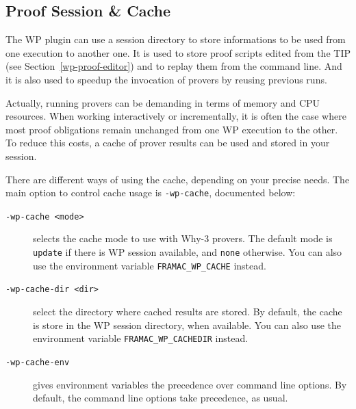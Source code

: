 \clearpage
\subsection{Proof Session \& Cache}
\label{wp-cache}

The \textsf{WP} plugin can use a session directory to store informations to be used from one execution to another one.
It is used to store proof scripts edited from the TIP (see Section~\ref{wp-proof-editor}) and to replay them from the command line.
And it is also used to speedup the invocation of provers by reusing previous runs.

Actually, running provers can be demanding in terms of memory and CPU resources. When working
interactively or incrementally, it is often the case where most proof obligations remain unchanged
from one \textsf{WP} execution to the other. To reduce this costs, a cache of prover results can be used
and stored in your session.

There are different ways of using the cache, depending on your precise needs.
The main option to control cache usage is \verb+-wp-cache+, documented below:

\begin{description}
\item[\tt -wp-cache <mode>] selects the cache mode to use with \textsf{Why-3}
  provers. The default mode is \verb'update' if there is \textsf{WP} session
  available, and \verb+none+ otherwise.  You can also use the environment
  variable \texttt{FRAMAC\_WP\_CACHE} instead.
\item[\tt -wp-cache-dir <dir>] select the directory where cached results are
  stored. By default, the cache is store in the \textsf{WP} session
  directory, when available.
  You can also use the environment variable
  \texttt{FRAMAC\_WP\_CACHEDIR} instead.
\item[\tt -wp-cache-env] gives environment variables the precedence over command line options.
  By default, the command line options take precedence, as usual.
\end{description}

